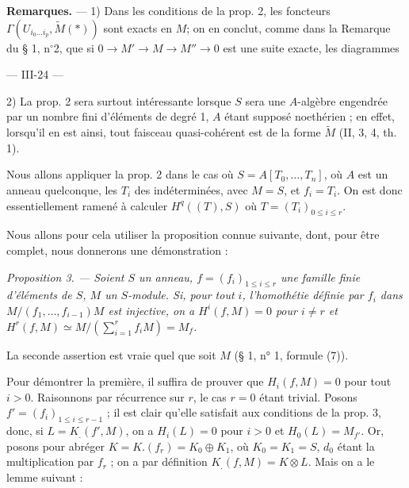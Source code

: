 \textbf{Remarques.} — 1) Dans les conditions de la prop. 2, les foncteurs $\Gamma(U_{i_0 \dots i_p}, \tilde{M}(*))$ sont exacts en $M$; on en conclut, comme dans la Remarque du § 1, n$^\circ$2, que si $0 \to M' \to M \to M'' \to 0$ est une suite exacte, les diagrammes


\newpage


--- III-24 ---

2) La prop. 2 sera surtout intéressante lorsque $S$ sera une $A$-algèbre engendrée par un nombre fini d'éléments de degré 1, $A$ étant supposé noethérien ; en effet, lorsqu'il en est ainsi, tout faisceau quasi-cohérent est de la forme $\widetilde{M}$ (II, 3, 4, th. 1).

Nous allons appliquer la prop. 2 dans le cas où $S = A[T_0, \dots, T_n]$, où $A$ est un anneau quelconque, les $T_i$ des indéterminées, avec $M=S$, et $f_i = T_i$. On est donc essentiellement ramené à calculer $H^q((T), S)$ où $T = (T_i)_{0 \leq i \leq r}$.

Nous allons pour cela utiliser la proposition connue suivante, dont, pour être complet, nous donnerons une démonstration :

\emph{Proposition 3. — Soient $S$ un anneau, $f = (f_i)_{1 \leq i \leq r}$ une famille finie d'éléments de $S$, $M$ un $S$-module. Si, pour tout $i$, l'homothétie définie par $f_i$ dans $M / (f_1, \dots, f_{i-1})M$ est injective, on a $H^i(f, M) = 0$ pour $i \neq r$ et $H^r(f, M) \simeq M / (\sum_{i=1}^r f_i M) = M_f$.}

La seconde assertion est vraie quel que soit $M$ (§ 1, n° 1, formule (7)).

Pour démontrer la première, il suffira de prouver que $H_i(f, M) = 0$ pour tout $i > 0$. Raisonnons par récurrence sur $r$, le cas $r=0$ étant trivial. Posons $f' = (f_i)_{1 \leq i \leq r-1}$ ; il est clair qu'elle satisfait aux conditions de la prop. 3, donc, si $L = K_.(f', M)$, on a $H_i(L) = 0$ pour $i > 0$ et $H_0(L) = M_{f'}$. Or, posons pour abréger $K = K.(f_r) = K_0 \oplus K_1$, où $K_0 = K_1 = S$, $d_0$ étant la multiplication par $f_r$ ; on a par définition $K_.(f, M) = K \otimes L$. Mais on a le lemme suivant :

